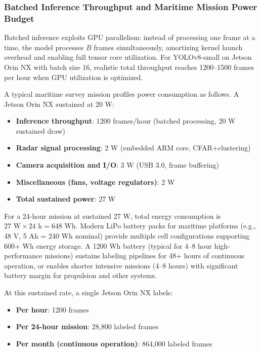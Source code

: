 \subsubsection{Batched Inference Throughput and Maritime Mission Power Budget}

Batched inference exploits GPU parallelism: instead of processing one frame at a time, the model processes $B$ frames simultaneously, amortizing kernel launch overhead and enabling full tensor core utilization. For YOLOv8-small on Jetson Orin NX with batch size 16, realistic total throughput reaches 1200--1500 frames per hour when GPU utilization is optimized.

A typical maritime survey mission profiles power consumption as follows. A Jetson Orin NX sustained at 20 W:

\begin{itemize}
  \item \textbf{Inference throughput}: 1200 frames/hour (batched processing, 20 W sustained draw)
  \item \textbf{Radar signal processing}: 2 W (embedded ARM core, CFAR+clustering)
  \item \textbf{Camera acquisition and I/O}: 3 W (USB 3.0, frame buffering)
  \item \textbf{Miscellaneous (fans, voltage regulators)}: 2 W
  \item \textbf{Total sustained power}: 27 W
\end{itemize}

For a 24-hour mission at sustained 27 W, total energy consumption is $27 \text{ W} \times 24 \text{ h} = 648 \text{ Wh}$. Modern LiPo battery packs for maritime platforms (e.g., 48 V, 5 Ah = 240 Wh nominal) provide multiple cell configurations supporting 600+ Wh energy storage. A 1200 Wh battery (typical for 4--8 hour high-performance missions) sustains labeling pipelines for 48+ hours of continuous operation, or enables shorter intensive missions (4--8 hours) with significant battery margin for propulsion and other systems.

At this sustained rate, a single Jetson Orin NX labels:
\begin{itemize}
  \item \textbf{Per hour}: 1200 frames
  \item \textbf{Per 24-hour mission}: 28,800 labeled frames
  \item \textbf{Per month (continuous operation)}: 864,000 labeled frames
\end{itemize}

